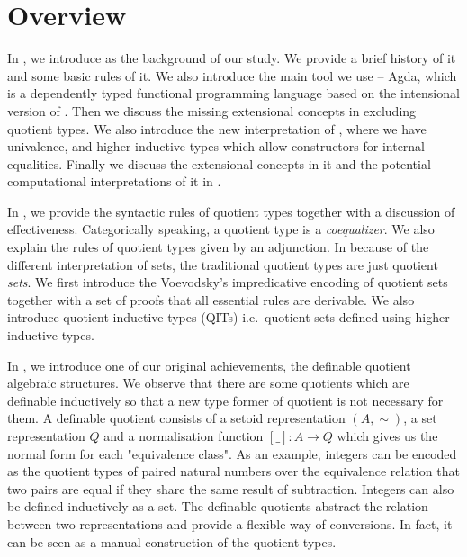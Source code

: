 \section{Overview}



In , we introduce \mltt as the background of our study. We provide a brief
history of it and some basic rules of it.
We also introduce the main tool we use -- Agda, which is a dependently typed functional
programming language based on the intensional version of \mltt. Then we discuss the missing extensional concepts in \itt excluding quotient types. We also introduce the new interpretation of \hott, where we have univalence, and higher inductive types which allow constructors for internal equalities. Finally we discuss the extensional concepts in it and the potential computational interpretations of it in \itt.


In , we provide the syntactic rules of quotient types together with a discussion of effectiveness. Categorically speaking, a quotient type is a \emph{coequalizer}. We also explain the rules of quotient types given by an adjunction. In \hott because of the different interpretation of sets, the traditional quotient types are just quotient \emph{sets}. We first introduce the Voevodsky's impredicative encoding of quotient sets together with a set of proofs that all essential rules are derivable. We also introduce quotient inductive types (QITs) i.e.\ quotient sets defined using higher inductive types.
 

In , we introduce one of our original achievements, the definable quotient algebraic structures. We observe that there are some quotients which are definable inductively so that a new type former of quotient is not necessary for them. A definable quotient consists of a setoid representation $(A, \sim)$, a set representation $Q$ and a normalisation function $[\_] : A \to Q$ which gives us the normal form for each "equivalence class".
As an example, integers can be encoded as the
quotient types of paired natural numbers over the equivalence
relation that two pairs are equal if they share the same result of
subtraction. Integers can also be defined inductively as a set. The definable quotients abstract the relation between two representations and provide a flexible way of conversions. In fact, it can be seen as a manual construction of the quotient types.


